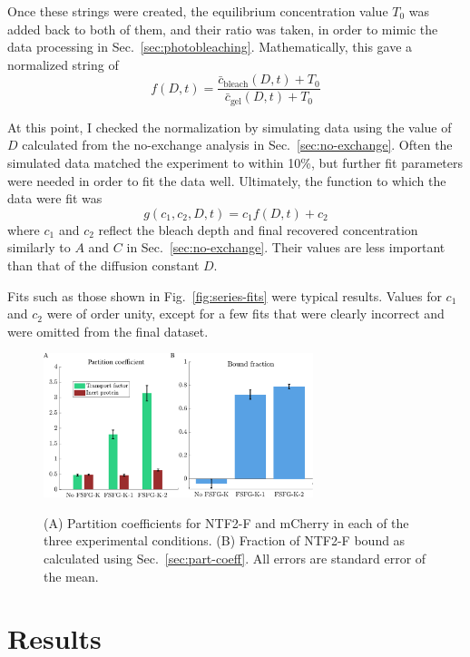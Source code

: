 Once these strings were created, the equilibrium concentration value $T_0$ was added back to both of them, and their ratio was taken, in order to mimic the data processing in Sec.~\ref{sec:photobleaching}.  Mathematically, this gave a normalized string of
\begin{equation}
f(D,t) = \frac{\bar{c}_\mathrm{bleach}(D,t)+T_0}{\bar{c}_\mathrm{gel}(D,t)+T_0}
\end{equation}

At this point, I checked the normalization by simulating data using the value of $D$ calculated from the no-exchange analysis in Sec.~\ref{sec:no-exchange}.  Often the simulated data matched the experiment to within 10\%, but further fit parameters were needed in order to fit the data well.  Ultimately, the function to which the data were fit was
\begin{equation}
g(c_1,c_2,D,t) = c_1f(D,t) + c_2
\end{equation}
where $c_1$ and $c_2$ reflect the bleach depth and final recovered concentration similarly to $A$ and $C$ in Sec.~\ref{sec:no-exchange}.  Their values are less important than that of the diffusion constant $D$.

Fits such as those shown in Fig.~\ref{fig:series-fits} were typical results.  Values for $c_1$ and $c_2$ were of order unity, except for a few fits that were clearly incorrect and were omitted from the final dataset.

\begin{figure}
\caption[Partition coefficients and fraction of NTF2 bound.]{(A) Partition coefficients for NTF2-F and mCherry in each of the three experimental conditions.  (B) Fraction of NTF2-F bound as calculated using Sec.~\ref{sec:part-coeff}.  All errors are standard error of the mean.}
\centering
\includegraphics[width=0.7\textwidth]{figs/ch04/fraction-bound}
\label{fig:frac-bound}
\end{figure} 
\section{Results}


